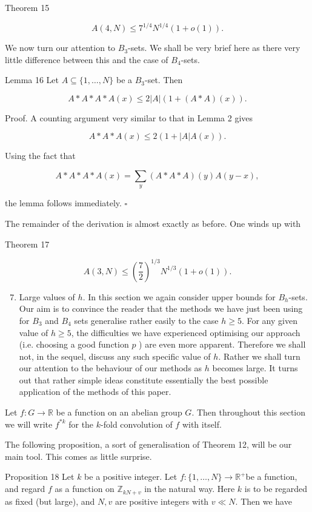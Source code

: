 \documentclass[10pt]{article}
\begin{document}
Theorem 15

$$
A(4, N) \leq 7^{1 / 4} N^{1 / 4}(1+o(1)) .
$$

We now turn our attention to $B_{3}$-sets. We shall be very brief here as there very little difference between this and the case of $B_{4}$-sets.

Lemma 16 Let $A \subseteq\{1, \ldots, N\}$ be a $B_{3}$-set. Then

$$
A * A * A * A(x) \leq 2|A|(1+(A * A)(x)) .
$$

Proof. A counting argument very similar to that in Lemma 2 gives

$$
A * A * A(x) \leq 2(1+|A| A(x)) .
$$

Using the fact that

$$
A * A * A * A(x)=\sum_{y}(A * A * A)(y) A(y-x),
$$

the lemma follows immediately. \(\square\)

The remainder of the derivation is almost exactly as before. One winds up with

Theorem 17

$$
A(3, N) \leq\left(\frac{7}{2}\right)^{1 / 3} N^{1 / 3}(1+o(1)) .
$$

\begin{enumerate}
  \setcounter{enumi}{6}
  \item Large values of $h$. In this section we again consider upper bounds for $B_{h}$-sets. Our aim is to convince the reader that the methods we have just been using for $B_{3}$ and $B_{4}$ sets generalise rather easily to the case $h \geq 5$. For any given value of $h \geq 5$, the difficulties we have experienced optimising our approach (i.e. choosing a good function $p$ ) are even more apparent. Therefore we shall not, in the sequel, discuss any such specific value of $h$. Rather we shall turn our attention to the behaviour of our methods as $h$ becomes large. It turns out that rather simple ideas constitute essentially the best possible application of the methods of this paper.
\end{enumerate}

Let $f: G \rightarrow \mathbb{R}$ be a function on an abelian group $G$. Then throughout this section we will write $f^{* k}$ for the $k$-fold convolution of $f$ with itself.

The following proposition, a sort of generalisation of Theorem 12, will be our main tool. This comes as little surprise.

Proposition 18 Let $k$ be a positive integer. Let $f:\{1, \ldots, N\} \rightarrow \mathbb{R}^{+}$be a function, and regard $f$ as a function on $\mathbb{Z}_{k N+v}$ in the natural way. Here $k$ is to be regarded as fixed (but large), and $N, v$ are positive integers with $v \ll N$. Then we have
\end{document}
